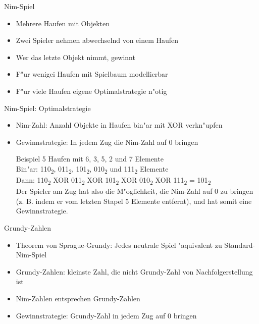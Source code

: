 \documentclass[18pt]{beamer}
\begin{document}
\begin{frame}{Nim-Spiel}
\begin{itemize}
\item Mehrere Haufen mit Objekten
\item Zwei Spieler nehmen abwechselnd von einem Haufen
\item Wer das letzte Objekt nimmt, gewinnt
\item F"ur wenigei Haufen mit Spielbaum modellierbar
\item F"ur viele Haufen eigene Optimalstrategie n"otig
\end{itemize}
\end{frame}

\begin{frame}{Nim-Spiel: Optimalstrategie}
\begin{itemize}
\item Nim-Zahl: Anzahl Objekte in Haufen bin"ar mit XOR verkn"upfen
\item Gewinnstrategie: In jedem Zug die Nim-Zahl auf 0 bringen
\begin{block}{Beispiel}
5 Haufen mit 6, 3, 5, 2 und 7 Elemente \\
Bin"ar: 110\textsubscript{2}, 011\textsubscript{2}, 101\textsubscript{2}, 010\textsubscript{2} und 111\textsubscript{2} Elemente\\
Dann: 110\textsubscript{2} XOR 011\textsubscript{2} XOR 101\textsubscript{2} XOR 010\textsubscript{2} XOR 111\textsubscript{2} = 101\textsubscript{2} \\
Der Spieler am Zug hat also die M"oglichkeit, die Nim-Zahl auf 0 zu bringen (z. B. indem er vom letzten Stapel 5 Elemente entfernt), und hat somit eine Gewinnstrategie.
\end{block}
\end{itemize}
\end{frame}

\begin{frame}{Grundy-Zahlen}
\begin{itemize}
\item Theorem von Sprague-Grundy: Jedes neutrale Spiel "aquivalent zu Standard-Nim-Spiel
\item Grundy-Zahlen: kleinste Zahl, die nicht Grundy-Zahl von Nachfolgerstellung ist
\item Nim-Zahlen entsprechen Grundy-Zahlen
\item Gewinnstrategie: Grundy-Zahl in jedem Zug auf 0 bringen
\end{itemize}
\end{frame}
\end{document}
